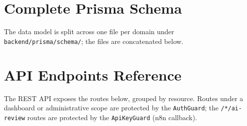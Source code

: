 \documentclass[12pt, a4paper, oneside]{report}
\begin{document}
\appendix

\chapter{Complete Prisma Schema}
\label{app:prisma-schema}

The data model is split across one file per domain under
\texttt{backend/prisma/schema/}; the files are concatenated below.



\chapter{API Endpoints Reference}
\label{app:api-reference}

The REST API exposes the routes below, grouped by resource. Routes
under a dashboard or administrative scope are protected by the
\texttt{AuthGuard}; the \texttt{/*/ai-review} routes are protected by
the \texttt{ApiKeyGuard} (n8n callback).
\end{document}
